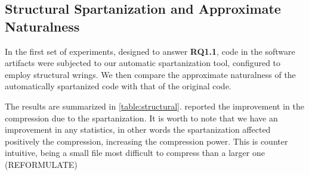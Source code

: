 \begin{description}
\begin{description}
\subsection{Structural Spartanization and Approximate Naturalness}
In the first set of experiments, designed to answer \textbf{RQ1.1}, \Java code
in the software artifacts were subjected to our automatic spartanization 
tool, configured to employ structural wrings. We then compare the approximate
naturalness of the automatically spartanized code with that of the original
code.

The results are summarized in \cref{table:structural}. 
reported the improvement in the compression due to the spartanization. It is
worth to note that we have an improvement in any statistics, in other words the
spartanization affected positively the compression, increasing the compression
power. This is counter intuitive, being a small file most difficult to
compress than a larger one (REFORMULATE)

\begin{table}
  \caption{Aggregating statistics of compression power after a structural spartanization.
  Comparison with the compressione ratio obtained with Jack and BZip2.}
  \label{table:structural}
  \par\vspace{10pt plus 6pt minus 4pt}
  \centering
\end{table}


\end{description}
\end{description}
